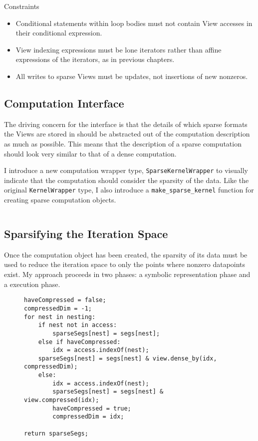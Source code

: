 Constraints
\begin{itemize}
	\item Conditional statements within loop bodies must not contain View accesses in their conditional expression.
	\item View indexing expressions must be lone iterators rather than affine expressions of the iterators, as in previous chapters.
	\item All writes to sparse Views must be updates, not insertions of new nonzeros.
\end{itemize}



\subsection{Computation Interface}

The driving concern for the interface is that the details of which sparse formats the Views are stored in should be abstracted out of the computation description as much as possible. 
This means that the description of a sparse computation should look very similar to that of a dense computation. 

I introduce a new computation wrapper type, \verb.SparseKernelWrapper. to visually indicate that the computation should consider the sparsity of the data. 
Like the original \verb.KernelWrapper. type, I also introduce a \verb.make_sparse_kernel. function for creating sparse computation objects. 



\begin{figure}
\begin{lstlisting}

\end{lstlisting}
\end{figure}



\subsection{Sparsifying the Iteration Space}

Once the computation object has been created, the sparsity of its data must be used to reduce the iteration space to only the points where nonzero datapoints exist.
My approach proceeds in two phases: a symbolic representation phase and a execution phase. 


\begin{figure}
\begin{lstlisting}[caption={Algorithm to sparsify iteration space based on access to SparseView}]
haveCompressed = false;
compressedDim = -1;
for nest in nesting:
	if nest not in access:
		sparseSegs[nest] = segs[nest];
	else if haveCompressed:
		idx = access.indexOf(nest);
	sparseSegs[nest] = segs[nest] & view.dense_by(idx, compressedDim);
	else:
		idx = access.indexOf(nest);
		sparseSegs[nest] = segs[nest] & view.compressed(idx);
		haveCompressed = true;
		compressedDim = idx;

return sparseSegs;
\end{lstlisting}
\end{figure}


